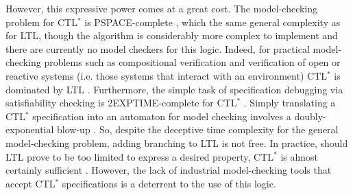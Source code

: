 \documentclass{elsarticle} %
\begin{document}
However, this expressive power comes at a great cost. The model-checking problem for CTL$^*$ is PSPACE-complete \cite{SC85}, which the same general complexity as for LTL, though the algorithm is considerably more complex to implement and there are currently no model checkers for this logic. Indeed, for practical model-checking problems such as compositional verification and verification of open or reactive systems (i.e. those systems that interact with an environment) CTL$^*$ is dominated by LTL \cite{Var98a}. Furthermore, the simple task of specification debugging via satisfiability checking is 2EXPTIME-complete for CTL$^*$ \cite{VS85,EJ88}. Simply translating a CTL$^*$ specification into an automaton for model checking involves a doubly-exponential blow-up \cite{ES84}. So, despite the deceptive time complexity for the general model-checking problem, adding branching to LTL is not free. In practice, should LTL prove to be too limited to express a desired property, CTL$^*$ is almost certainly sufficient \cite{BBFLPPS01}. However, the lack of industrial model-checking tools that accept CTL$^*$ specifications is a deterrent to the use of this logic.





\end{document}
